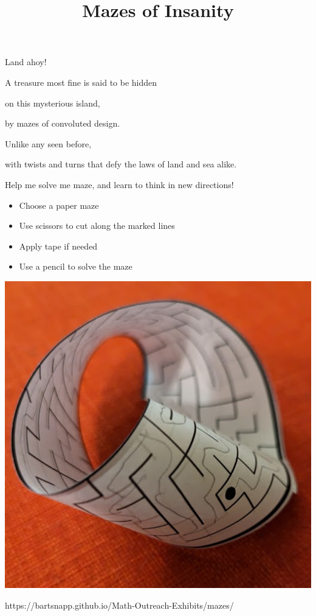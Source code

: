 \documentclass{../exhibit}
\title{Mazes of Insanity}
\begin{document}
\begin{context}

Land ahoy!

A treasure most fine is said to be hidden


on this mysterious island, 


by mazes of convoluted design.



Unlike any seen before,


with twists and turns that defy the laws of land and sea alike.



Help me solve me maze, and learn to think in new directions!
\end{context}

\begin{directions}
  \begin{itemize}
    \item Choose a paper maze
\item Use scissors to cut along the marked lines 
\item Apply tape if needed
  \item Use a pencil to solve the maze
\end{itemize}
\end{directions}

\begin{example}
  \begin{center}
    \includegraphics[width=.5\textwidth]{papermaze.jpg}
  \end{center}
\end{example}

\begin{mathConnections}
  https://bartsnapp.github.io/Math-Outreach-Exhibits/mazes/
\end{mathConnections}
\end{document}
